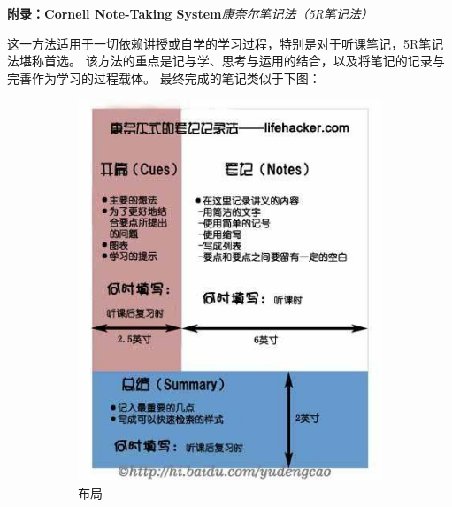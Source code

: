 \newpage

{\bf 附录：Cornell Note-Taking System}\hfill{\it 康奈尔笔记法（5R笔记法）}

这一方法适用于一切依赖讲授或自学的学习过程，特别是对于听课笔记，5R笔记法堪称首选。
该方法的重点是记与学、思考与运用的结合，以及将笔记的记录与完善作为学习的过程载体。
最终完成的笔记类似于下图：

\begin{figure}[h]
	\centering
	\begin{subfigure}[t]{0.45\textwidth}
		\centering
		\includegraphics[width=\textwidth]{./images/Ch00/Cornell-NTS/NTS-CH.jpg}
		\caption{布局}\label{fig:5R-1}
	\end{subfigure}
	\begin{subfigure}[t]{0.45\textwidth}
		\centering

\end{subfigure}
\end{figure}
